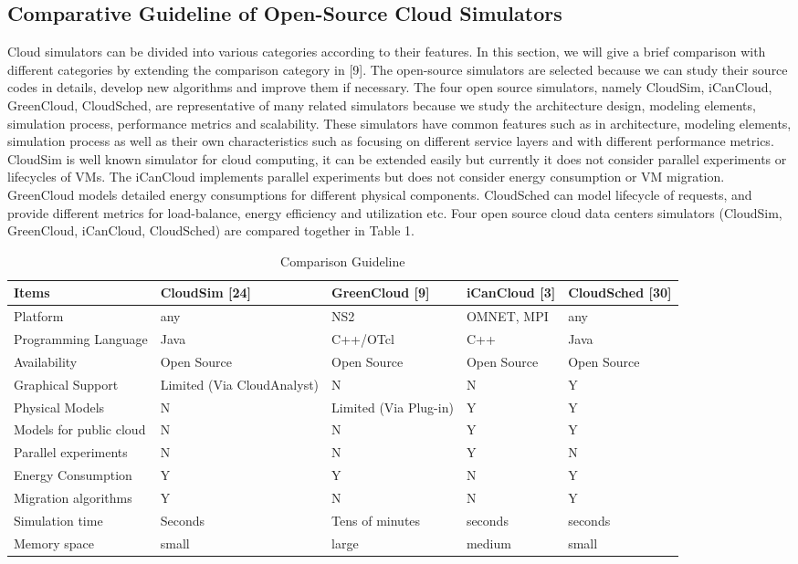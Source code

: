 \documentclass[3p, twocolumn]{elsarticle}
\begin{document}
\subsection{Comparative Guideline of Open-Source Cloud Simulators}
Cloud simulators can be divided into various categories according to their features. In this section, we will give a brief comparison with different categories by extending the comparison category in [9]. The open-source simulators are selected because we can study their source codes in details, develop new algorithms and improve them if necessary. The four open source simulators, namely CloudSim, iCanCloud, GreenCloud, CloudSched, are representative of many related simulators because we study the architecture design, modeling elements, simulation process, performance metrics and scalability. These simulators have common features such as in architecture, modeling elements, simulation process as well as their own characteristics such as focusing on different service layers and with different performance metrics.
CloudSim is well known simulator for cloud computing, it can be extended easily but currently it does not consider parallel experiments or lifecycles of VMs. The iCanCloud implements parallel experiments but does not consider energy consumption or VM migration. GreenCloud models detailed energy consumptions for different physical components. CloudSched can model lifecycle of requests, and provide different metrics for load-balance, energy efficiency and utilization etc.
Four open source cloud data centers simulators (CloudSim, GreenCloud, iCanCloud, CloudSched) are compared together in Table 1.
\begin{table*}
\scriptsize
\caption{Comparison Guideline}
\begin{center}
\begin{tabular}{l|l|l|l|l}
\hline Items & CloudSim [24] &GreenCloud [9]& iCanCloud [3] &CloudSched [30]
\\\hline
\hline Platform & any & NS2 & OMNET, MPI & any \\
\hline Programming Language & Java & C++/OTcl &C++ & Java \\
\hline Availability & Open Source &Open Source&Open Source & Open Source \\
\hline Graphical Support & Limited (Via CloudAnalyst) &N&N&Y\\
\hline Physical Models& N &Limited (Via Plug-in)&Y&Y\\
\hline Models for public cloud & N &N&Y&Y\\
\hline Parallel experiments & N&N&Y&N \\
\hline Energy Consumption &Y&Y&N&Y\\
\hline Migration algorithms &Y&N&N&Y\\
\hline Simulation time&Seconds&Tens of minutes&seconds&seconds\\
\hline Memory space&small&large&medium&small\\
\hline
\end{tabular} \\
\end{center}
\end{table*}
\end{document}
